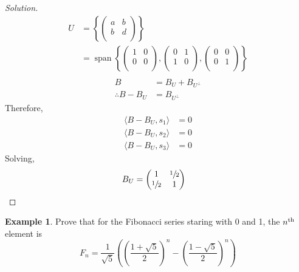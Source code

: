 \documentclass[fleqn, a4paper, 12pt]{article}
\theoremstyle{definition}
\newtheorem{example}{Example}
\theoremstyle{theorem}
\newenvironment{solution}
{\begin{proof}[Solution]\let\qed\relax}
	{\end{proof}}
\DeclareMathOperator{\vspan}{\mathrm{span}} %
\begin{document}
\begin{solution}
	\begin{align*}
		U &= 
			\left\{
				\begin{pmatrix}
					a & b\\
					b & d\\
				\end{pmatrix}
			\right\}\\
		&= \vspan
			\left\{
				\begin{pmatrix}
					1 & 0\\
					0 & 0\\
				\end{pmatrix}
				,
				\begin{pmatrix}
					0 & 1\\
					1 & 0\\
				\end{pmatrix}
				,
				\begin{pmatrix}
					0 & 0\\
					0 & 1\\
				\end{pmatrix}
			\right\}\\
	\end{align*}
	\begin{align*}
		B &= B_U + B_{U^{\perp}}\\
		\therefore B - B_U &= B_{U^{\perp}}
	\end{align*}
	Therefore,
	\begin{align*}
		\langle B - B_U, s_1 \rangle &= 0\\
		\langle B - B_U, s_2 \rangle &= 0\\
		\langle B - B_U, s_3 \rangle &= 0
	\end{align*}
	Solving,
	\begin{align*}
		B_U &= 
			\begin{pmatrix}
				1 & \sfrac{1}{2}\\
				\sfrac{1}{2} & 1\\
			\end{pmatrix}
	\end{align*}
\end{solution}

\begin{example}
	Prove that for the Fibonacci series staring with 0 and 1, the $n^{\textnormal{th}}$ element is
	\begin{equation*}
		F_n = \dfrac{1}{\sqrt{5}} \left( \left( \dfrac{1 + \sqrt{5}}{2} \right)^n - \left( \dfrac{1 - \sqrt{5}}{2} \right)^n \right)
	\end{equation*}
\end{example}
\end{document}
